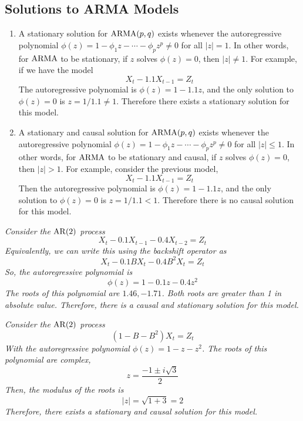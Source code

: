 \subsection{Solutions to ARMA Models}
\begin{enumerate}[label=(\roman*)]
    \item A stationary solution for $\operatorname{ARMA}(p,q)$ exists whenever the autoregressive polynomial $\phi(z) = 1 - \phi_1z - \cdots - \phi_pz^p \neq 0$ for all $|z| = 1$. In other words, for $\operatorname{ARMA}$ to be stationary, if $z$ solves $\phi(z) = 0$, then $|z| \neq 1$. For example, if we have the model 
    \[X_t - 1.1X_{t-1} = Z_t\]
    The autoregressive polynomial is $\phi(z) = 1-1.1z$, and the only solution to $\phi(z) = 0$ is $z = 1/1.1 \neq 1$. Therefore there exists a stationary solution for this model.
    \item A stationary and causal solution for $\operatorname{ARMA}(p,q)$ exists whenever the autoregressive polynomial $\phi(z) = 1 - \phi_1z - \cdots - \phi_pz^p \neq 0$ for all $|z| \leq 1$. In other words, for $\operatorname{ARMA}$ to be stationary and causal, if $z$ solves $\phi(z) = 0$, then $|z| > 1$. For example, consider the previous model,
    \[X_t - 1.1X_{t-1} = Z_t\]
    Then the autoregressive polynomial is $\phi(z) = 1-1.1z$, and the only solution to $\phi(z) = 0$ is $z = 1/1.1 < 1$. Therefore there is no causal solution for this model.
\end{enumerate}

\begin{example}
    \emph{
        Consider the $\operatorname{AR}(2)$ process 
        \[X_t - 0.1X_{t-1} - 0.4X_{t-2} = Z_t\]
        Equivalently, we can write this using the backshift operator as 
        \[X_t - 0.1BX_t - 0.4B^2X_t = Z_t\]
        So, the autoregressive polynomial is 
        \[\phi(z) = 1 - 0.1z - 0.4z^2\]
        The roots of this polynomial are $1.46,-1.71$. Both roots are greater than 1 in absolute value. Therefore, there is a causal and stationary solution for this model.
    }
\end{example}

\begin{example}
    \emph{
        Consider the $\operatorname{AR}(2)$ process
        \[(1-B-B^2)X_t = Z_t\]
        With the autoregressive polynomial $\phi(z) = 1-z-z^2$. The roots of this polynomial are complex,
        \[z = \frac{-1 \pm i\sqrt{3}}{2}\]
        Then, the modulus of the roots is
        \[|z| = \sqrt{1 + 3} = 2\] 
        Therefore, there exists a stationary and causal solution for this model.
    }
\end{example}

